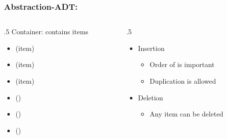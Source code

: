 \documentclass[aspectratio=169,10pt,compress]{beamer}
\begin{document}
\begin{frame}\frametitle{Abstraction-ADT: }
	\begin{columns}[T] %
	\begin{column}{.5\linewidth} %
	    	Container: contains items
		\begin{itemize}
			\item {}(item)
			\item {}(item)
			\item {}(item)
			\item {}()
			\item {}()
			\item {}()			
		\end{itemize}
	\end{column} %
	\begin{column}{.5\linewidth} %
		\begin{itemize}

			\item
			Insertion
			\begin{itemize}
				\item
				Order of is  important
	
				\item
				Duplication is allowed
			\end{itemize}

			\item
			Deletion
			\begin{itemize}
				\item
				Any item can be deleted
			\end{itemize}
		\end{itemize}
	\end{column} %
	\end{columns} %
\end{frame}




\end{document}
